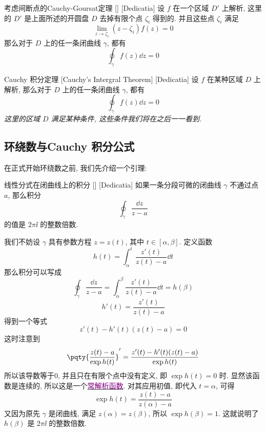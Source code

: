 \documentclass[UTF8]{ctexart}
\newcommand{\hyperrefc}[2]{\hyperref[#1]{\textcolor{purple}{#2}}}
\begin{document}
        \begin{thm}
            [UUID]
            {考虑间断点的Cauchy-Goursat定理}
            []
            [Dedicatia]
            设 \(f\) 在一个区域 \(D'\) 上解析, 这里的 \(D'\) 是上面所述的开圆盘 \(D\) 去掉有限个点 \(\zeta_i\) 得到的. 并且这些点 \(\zeta_i\) 满足
            \[\lim_{z\to\zeta_i }(z-\zeta_i)f(z)=0\]
            那么对于 \(D\) 上的任一条闭曲线 \(\gamma\), 都有
            \[\oint_\gamma f(z)\dd{z}=0\]
        \end{thm}
        
        \begin{thm}
            [Cauchy]
            {Cauchy 积分定理}
            [Cauchy's Intergral Theorem]
            [Dedicatia]
            设 \(f\) 在某种区域 \(D\) 上解析, 那么对于 \(D\) 上的任一条闭曲线 \(\gamma\), 都有
            \[\oint_\gamma f(z)\dd{z}=0\]
            \textit{这里的区域 \(D\) 满足某种条件, 这些条件我们将在之后一一看到. }
        \end{thm}

    \subsection{环绕数与Cauchy 积分公式}

        在正式开始环绕数之前, 我们先介绍一个引理:

        \begin{lma}
            [UUID]
            {线性分式在闭曲线上的积分}
            []
            [Dedicatia]
            如果一条分段可微的闭曲线 \(\gamma\) 不通过点 \(a\), 那么积分
            \[\oint_\gamma\frac{\dd{z}}{z-a} \]
            的值是 \(2\pi\ii\) 的整数倍数. 
        \end{lma}

        \begin{prf}
            我们不妨设 \(\gamma\) 具有参数方程 \(z=z(t)\), 其中 \(t\in[\alpha,\beta]\). 定义函数
            \[h(t)=\int_\alpha^t \frac{z'(t)}{z(t)-a}\dd{t}\]
            那么积分可以写成
            \[\oint_\gamma\frac{\dd{z}}{z-a}=\int_\alpha^\beta \frac{z'(t)}{z(t)-a}\dd{t}=h(\beta)\]
            \[h'(t)=\frac{z'(t)}{z(t)-a}\]
            得到一个等式
            \[z'(t)-h'(t)(z(t)-a)=0\]
            这时注意到
            \[\pqty{\frac{z(t)-a}{\exp h(t)}}'=\frac{z'(t)-h'(t)(z(t)-a)}{\exp h(t)}\]
            所以该导数等于0, 并且只在有限个点中没有定义, 即 \(\exp h(t)=0\) 时. 显然该函数是连续的, 所以这是一个\hyperrefc{ppt:TrivialAnalyticalFunction}{常解析函数}. 对其应用初值, 即代入 \(t=\alpha\), 可得
            \[\exp h(t)=\frac{z(t)-a}{z(\alpha)-a}\]
            又因为原先 \(\gamma\) 是闭曲线, 满足 \(z(\alpha)=z(\beta)\), 所以 \(\exp h(\beta)=1\). 这就说明了 \(h(\beta)\) 是 \(2\pi\ii\) 的整数倍数. 
        \end{prf}
\end{document}
